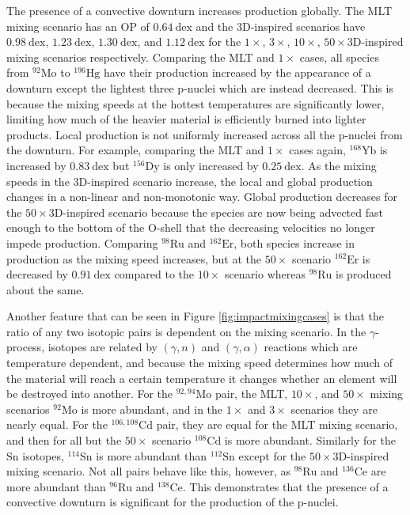 The presence of a convective downturn increases production globally.
The MLT mixing scenario has an $\mathrm{OP}$ of $0.64~\mathrm{dex}$ and the 3D-inspired scenarios have $0.98~\mathrm{dex}$, $1.23~\mathrm{dex}$, $1.30~\mathrm{dex}$, and $1.12~\mathrm{dex}$ for the $1\times$, $3\times$, $10\times$, $50\times$3D-inspired mixing scenarios respectively. 
Comparing the MLT and $1\times$ cases, all species from $^{92}\mathrm{Mo}$ to $^{196}\mathrm{Hg}$ have their production increased by the appearance of a downturn except the lightest three p-nuclei which are instead decreased.
This is because the mixing speeds at the hottest temperatures are significantly lower, limiting how much of the heavier material is efficiently burned into lighter products.
Local production is not uniformly increased across all the p-nuclei from the downturn. 
For example, comparing the MLT and $1\times$ cases again, $^{168}\mathrm{Yb}$ is increased by $0.83~\mathrm{dex}$ but $^{156}\mathrm{Dy}$ is only increased by $0.25~\mathrm{dex}$.
As the mixing speeds in the 3D-inspired scenario increase, the local and global production changes in a non-linear and non-monotonic way. 
Global production decreases for the $50\times$3D-inspired scenario because the species are now being advected fast enough to the bottom of the O-shell that the decreasing velocities no longer impede production. 
Comparing $^{98}\mathrm{Ru}$ and $^{162}\mathrm{Er}$, both species increase in production as the mixing speed increases, but at the $50\times$ scenario $^{162}\mathrm{Er}$ is decreased by $0.91~\mathrm{dex}$ compared to the $10\times$ scenario whereas $^{98}\mathrm{Ru}$ is produced about the same. 

Another feature that can be seen in Figure \ref{fig:impactmixingcases} is that the ratio of any two isotopic pairs is dependent on the mixing scenario. 
In the $\gamma$-process, isotopes are related by $(\gamma,n)$ and $(\gamma,\alpha)$ reactions which are temperature dependent, and because the mixing speed determines how much of the material will reach a certain temperature it changes whether an element will be destroyed into another.
For the $^{92,94}\mathrm{Mo}$ pair, the MLT, $10\times$, and $50\times$ mixing scenarios $^{92}\mathrm{Mo}$ is more abundant, and in the $1\times$ and $3\times$ scenarios they are nearly equal. 
For the $^{106,108}\mathrm{Cd}$ pair, they are equal for the MLT mixing scenario, and then for all but the $50\times$ scenario $^{108}\mathrm{Cd}$ is more abundant.
Similarly for the $\mathrm{Sn}$ isotopes, $^{114}\mathrm{Sn}$ is more abundant than $^{112}\mathrm{Sn}$ except for the $50\times$3D-inspired mixing scenario.
Not all pairs behave like this, however, as $^{98}\mathrm{Ru}$ and $^{136}\mathrm{Ce}$ are more abundant than $^{96}\mathrm{Ru}$ and $ ^{138}\mathrm{Ce}$.
This demonstrates that the presence of a convective downturn is significant for the production of the p-nuclei. 

